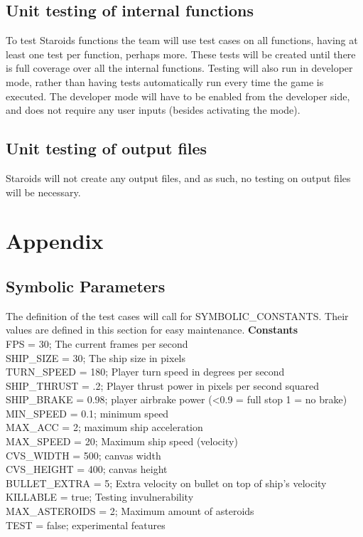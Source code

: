 \documentclass[12pt, titlepage]{article}
\begin{document}
\subsection{Unit testing of internal functions}
To test Staroids functions the team will use test cases on all functions, having at least one test per function, perhaps more. These tests will be created until there is full coverage over all the internal functions. Testing will also run in developer mode, rather than having tests automatically run every time the game is executed. The developer mode will have to be enabled from the developer side, and does not require any user inputs (besides activating the mode).

\subsection{Unit testing of output files}
Staroids will not create any output files, and as such, no testing on output files will be necessary.





\newpage

\section{Appendix}


\subsection{Symbolic Parameters}

The definition of the test cases will call for SYMBOLIC\_CONSTANTS.
Their values are defined in this section for easy maintenance.
\textbf{Constants}\\
FPS = 30; The current frames per second\\
SHIP\_SIZE = 30; The ship size in pixels\\
TURN\_SPEED = 180; Player turn speed in degrees per second\\
SHIP\_THRUST = .2; Player thrust power in pixels per second squared \\
SHIP\_BRAKE = 0.98; player airbrake power (<0.9 = full stop 1 = no brake) \\
MIN\_SPEED = 0.1; minimum speed \\
MAX\_ACC = 2; maximum ship acceleration \\
MAX\_SPEED = 20; Maximum ship speed (velocity) \\
CVS\_WIDTH = 500; canvas width \\
CVS\_HEIGHT = 400; canvas height \\
BULLET\_EXTRA = 5; Extra velocity on bullet on top of ship's velocity \\
KILLABLE = true; Testing invulnerability \\
MAX\_ASTEROIDS = 2; Maximum amount of asteroids \\
TEST = false; experimental features \\
\end{document}
